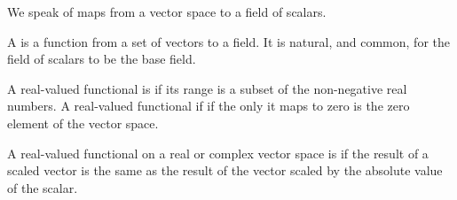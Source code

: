 
\sbasic



\sstart



We speak of maps
from a vector space
to a field of scalars.


A
is a function from
a set of vectors to a field.
It is natural, and common,
for the field of scalars
to be the base field.

A real-valued functional is
if its
range is a subset of
the non-negative real
numbers.
A real-valued functional if
if the only it maps to zero is
the zero element of the vector space.

A real-valued functional
on a real or complex
vector space is
if the result of a scaled vector
is the same as the result of the vector
scaled by the absolute value of the scalar.

\strats
